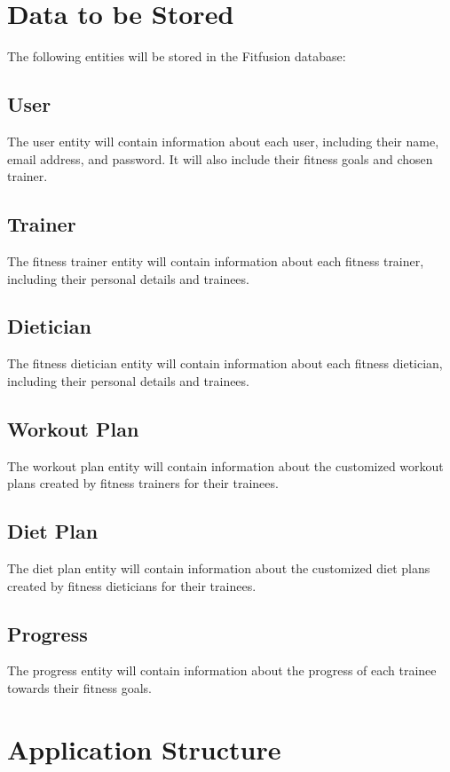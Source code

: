 \documentclass{article}
\begin{document}
\section{Data to be Stored}
The following entities will be stored in the Fitfusion database:

\subsection{User}
The user entity will contain information about each user, including their name, email address, and password. It will also include their fitness goals and chosen trainer.

\subsection{Trainer}
The fitness trainer entity will contain information about each fitness trainer, including their personal details and trainees.

\subsection{Dietician}
The fitness dietician entity will contain information about each fitness dietician, including their personal details and trainees.

\subsection{Workout Plan}
The workout plan entity will contain information about the customized workout plans created by fitness trainers for their trainees.

\subsection{Diet Plan}
The diet plan entity will contain information about the customized diet plans created by fitness dieticians for their trainees.

\subsection{Progress}
The progress entity will contain information about the progress of each trainee towards their fitness goals.

\section{Application Structure}
\end{document}
